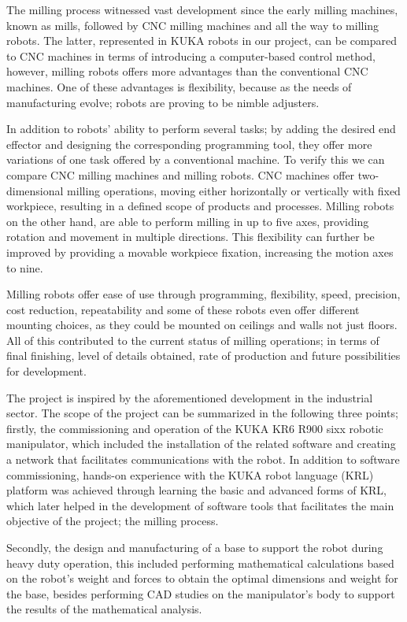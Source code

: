 	The milling process witnessed vast development since the early milling machines, known as mills, followed by CNC milling machines and all the way to milling robots. The latter, represented in KUKA robots in our project, can be compared to CNC machines in terms of introducing a computer-based control method, however, milling robots offers more advantages than the conventional CNC machines. One of these advantages is flexibility, because as the needs of manufacturing evolve; robots are proving to be nimble adjusters. 
	
\bigskip	
	
	In addition to robots’ ability to perform several tasks; by adding the desired end effector and designing the corresponding programming tool, they offer more variations of one task offered by a conventional machine. To verify this we can compare CNC milling machines and milling robots. CNC machines offer two-dimensional milling operations, moving either horizontally or vertically with fixed workpiece, resulting in a defined scope of products and processes. Milling robots on the other hand, are able to perform milling in up to five axes, providing rotation and movement in multiple directions. This flexibility can further be improved by providing a movable workpiece fixation, increasing the motion axes to nine.
	
	
	Milling robots offer ease of use through programming, flexibility, speed, precision, cost reduction, repeatability and some of these robots even offer different mounting choices, as they could be mounted on ceilings and walls not just floors. All of this contributed to the current status of milling operations; in terms of final finishing, level of details obtained, rate of production and future possibilities for development. 
	
	
	The project is inspired by the aforementioned development in the industrial sector. The scope of the project can be summarized in the following three points; firstly, the commissioning and operation of the KUKA KR6 R900 sixx robotic manipulator, which included the installation of the related software and creating a network that facilitates communications with the robot. In addition to software commissioning, hands-on experience with the KUKA robot language (KRL) platform was achieved through learning the basic and advanced forms of KRL, which later helped in the development of software tools that facilitates the main objective of the project; the milling process. 
	
\smallskip	
	Secondly, the design and manufacturing of a base to support the robot during heavy duty operation, this included performing mathematical calculations based on the robot’s weight and forces to obtain the optimal dimensions and weight for the base, besides performing CAD studies on the manipulator’s body to support the results of the mathematical analysis. 
	
